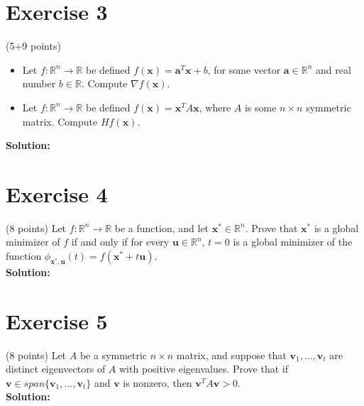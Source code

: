 \documentclass{article}
\begin{document}
\section*{Exercise 3}
(5+9 points)
\begin{itemize}
    \item Let $f: \mathbb{R}^n \to \mathbb{R}$ be defined $f(\mathbf{x}) = \mathbf{a}^T\mathbf{x} + b$, for some vector $\mathbf{a} \in \mathbb{R}^n$ and real number $b \in \mathbb{R}$. Compute $\nabla f(\mathbf{x})$.
    \item Let $f: \mathbb{R}^n \to \mathbb{R}$ be defined $f(\mathbf{x}) = \mathbf{x}^T A\mathbf{x}$, where $A$ is some $n \times n$ symmetric matrix. Compute $Hf(\mathbf{x})$.
\end{itemize}

\textbf{Solution:}

\newpage

\section*{Exercise 4}
(8 points) Let $f: \mathbb{R}^n \to \mathbb{R}$ be a function, and let $\mathbf{x}^* \in \mathbb{R}^n$. Prove that $\mathbf{x}^*$ is a global minimizer of $f$ if and only if for every $\mathbf{u} \in \mathbb{R}^n$, $t = 0$ is a global minimizer of the function $\phi_{\mathbf{x}^*,\mathbf{u}}(t) = f(\mathbf{x}^* + t\mathbf{u})$. \\

\textbf{Solution:}

\newpage

\section*{Exercise 5}
(8 points) Let $A$ be a symmetric $n \times n$ matrix, and suppose that $\mathbf{v}_1,\ldots,\mathbf{v}_t$ are distinct eigenvectors of $A$ with positive eigenvalues. Prove that if $\mathbf{v} \in span\{\mathbf{v}_1,\ldots,\mathbf{v}_t\}$ and $\mathbf{v}$ is nonzero, then $\mathbf{v}^T A\mathbf{v} > 0$. \\

\textbf{Solution:}

\newpage
\end{document}
